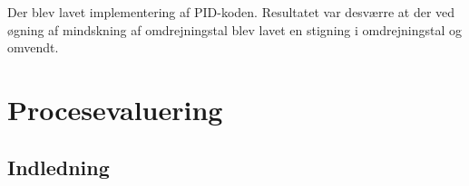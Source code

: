 Der blev lavet implementering af PID-koden. Resultatet var desværre at der ved øgning af mindskning af omdrejningstal blev lavet en stigning i omdrejningstal og omvendt.


% 

\clearpage


% 

% 

% 

% 

% 

% 

% 

% 

% 

\chapter{Procesevaluering}
\label{cha:procesevaluering}

\section{Indledning}
\label{sec:indledning}

